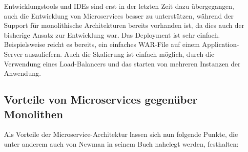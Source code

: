 \documentclass[12pt,a4paper,bibliography=totocnumbered,listof=totocnumbered]{scrartcl}
\begin{document}
Entwicklungstools und IDEs sind erst in der letzten Zeit dazu übergegangen, auch die Entwicklung von Microservices besser zu unterstützen, während der Support für monolithische Architekturen bereits vorhanden ist, da dies auch der bisherige Ansatz zur Entwicklung war.
Das Deployment ist sehr einfach. Beispielsweise reicht es bereits, ein einfaches WAR-File auf einem Application-Server auszuliefern.
Auch die Skalierung ist einfach möglich, durch die Verwendung eines Load-Balancers und das starten von mehreren Instanzen der Anwendung.\cite{richardson}

\subsection{Vorteile von Microservices gegenüber Monolithen}\label{ch:ms-mon-pro}

Als Vorteile der Microservice-Architektur lassen sich nun folgende Punkte, die unter anderem auch von Newman in seinem Buch nahelegt werden, festhalten\cite{buildingms}:
\end{document}
